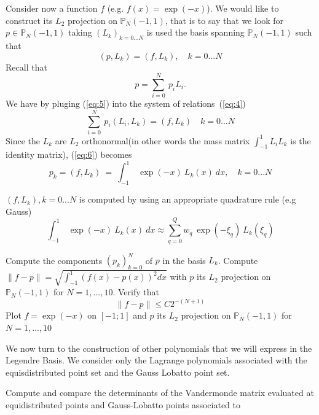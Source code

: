 \documentclass{article}
\begin{document}
\begin{Exercise}[title={p type Galerkin method in 1D}]
  \ExePart
   Consider now a function $f$ (e.g. $f(x)=\exp(-x)$). We
  would like to construct its $L_2$ projection on
  $\mathbb{P}_N(-1,1)$, that is to say that we look for $p \in
  \mathbb{P}_N(-1,1)$ taking $(L_k)_{k=0...N}$ is used the basis spanning
  $\mathbb{P}_N(-1,1)$ such that
  \begin{equation}
    \label{eq:4}
    (p, L_k) = (f, L_k), \quad k=0...N
  \end{equation}
  Recall that
  \begin{equation}
    \label{eq:5}
    p=\sum_{i=0}^N\ p_i L_i.
  \end{equation}
  We have by pluging (\ref{eq:5}) into the system of relations~(\ref{eq:4})
  \begin{equation}
    \label{eq:6}
    \sum_{i=0}^N\ p_i (L_i,L_k) = (f, L_k)\quad k=0...N
  \end{equation}
  Since the $L_k$ are $L_2$ orthonormal(in other words the mass matrix
  $\int_{-1}^1 L_i L_k$ is the identity matrix), (\ref{eq:6}) becomes
  \begin{equation}
    \label{eq:7}
    p_k = (f, L_k)\ =\ \int_{-1}^1\ \exp(-x)\ L_k(x)\ dx, \quad k=0...N
  \end{equation}

  $(f,L_k), k=0...N$ is computed by using an appropriate quadrature
  rule (e.g Gauss)
  \begin{equation}
    \label{eq:8}
    \int_{-1}^1\ \exp(-x)\ L_k(x)\ dx \approx \sum_{q=0}^Q w_q\ \exp(-\xi_q)\ L_k(\xi_q)
  \end{equation}

  \Question Compute the components $(p_k)_{k=0}^N$ of $p$ in the basis
  $L_k$.
  \Question Compute $\|f-p\|=\sqrt{\int_{-1}^1 (f(x)-p(x))^2 dx}$ with $p$ its $L_2$ projection on
  $\mathbb{P}_N(-1,1)$ for $N=1,...,10$. Verify that
  \begin{equation}
    \label{eq:9}
    \|f-p\| \leq C 2^{-(N+1)}
  \end{equation}
  \Question Plot $f=\exp(-x)$
  on $[-1;1]$ and $p$ its $L_2$ projection on $\mathbb{P}_N(-1,1)$ for
  $N=1,...,10$

  \ExePart We now turn to the construction of other polynomials that
  we will express in the Legendre Basis. We consider only the Lagrange
  polynomials associated with the equisdistributed point set and the
  Gauss Lobatto point set.

  \Question Compute and compare the determinants of the Vandermonde
  matrix evaluated at equidistributed points and Gauss-Lobatto points
  associated to


\end{Exercise}
\end{document}
